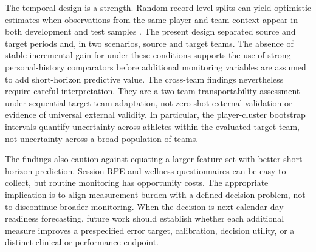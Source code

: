 The temporal design is a strength. Random record-level splits can yield optimistic estimates when observations from the same player and team context appear in both development and test samples \citep{Bergmeir2018,Roberts2017}. The present design separated source and target periods and, in two scenarios, source and target teams. The absence of stable incremental gain for \Pone{} under these conditions supports the use of strong personal-history comparators before additional monitoring variables are assumed to add short-horizon predictive value. The cross-team findings nevertheless require careful interpretation. They are a two-team transportability assessment under sequential target-team adaptation, not zero-shot external validation or evidence of universal external validity. In particular, the player-cluster bootstrap intervals quantify uncertainty across athletes within the evaluated target team, not uncertainty across a broad population of teams.

The findings also caution against equating a larger feature set with better short-horizon prediction. Session-RPE and wellness questionnaires can be easy to collect, but routine monitoring has opportunity costs. The appropriate implication is to align measurement burden with a defined decision problem, not to discontinue broader monitoring. When the decision is next-calendar-day readiness forecasting, future work should establish whether each additional measure improves a prespecified error target, calibration, decision utility, or a distinct clinical or performance endpoint.

